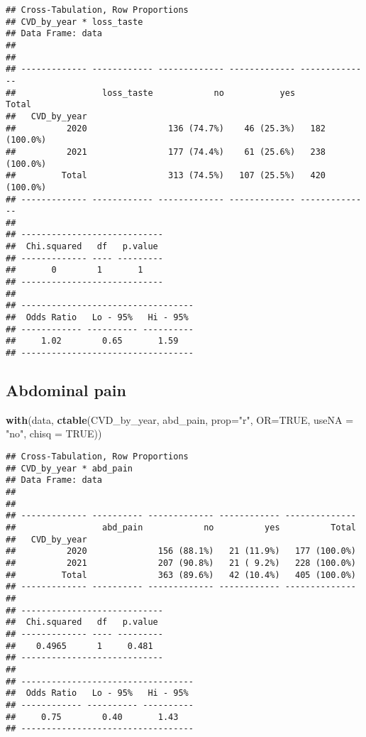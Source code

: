 \documentclass[
]{article}
\newenvironment{Shaded}{\begin{snugshade}}{\end{snugshade}}
\newcommand{\AttributeTok}[1]{\textcolor[rgb]{0.13,0.29,0.53}{#1}}
\newcommand{\ConstantTok}[1]{\textcolor[rgb]{0.56,0.35,0.01}{#1}}
\newcommand{\FunctionTok}[1]{\textcolor[rgb]{0.13,0.29,0.53}{\textbf{#1}}}
\newcommand{\NormalTok}[1]{#1}
\newcommand{\StringTok}[1]{\textcolor[rgb]{0.31,0.60,0.02}{#1}}
\begin{document}
\begin{verbatim}
## Cross-Tabulation, Row Proportions  
## CVD_by_year * loss_taste  
## Data Frame: data  
## 
## 
## ------------- ------------ ------------- ------------- --------------
##                 loss_taste            no           yes          Total
##   CVD_by_year                                                        
##          2020                136 (74.7%)    46 (25.3%)   182 (100.0%)
##          2021                177 (74.4%)    61 (25.6%)   238 (100.0%)
##         Total                313 (74.5%)   107 (25.5%)   420 (100.0%)
## ------------- ------------ ------------- ------------- --------------
## 
## ----------------------------
##  Chi.squared   df   p.value 
## ------------- ---- ---------
##       0        1       1    
## ----------------------------
## 
## ----------------------------------
##  Odds Ratio   Lo - 95%   Hi - 95% 
## ------------ ---------- ----------
##     1.02        0.65       1.59   
## ----------------------------------
\end{verbatim}

\hypertarget{abdominal-pain}{%
\subsection{Abdominal pain}\label{abdominal-pain}}

\begin{Shaded}
\begin{Highlighting}[]
\FunctionTok{with}\NormalTok{(data, }\FunctionTok{ctable}\NormalTok{(CVD\_by\_year, abd\_pain, }\AttributeTok{prop=}\StringTok{"r"}\NormalTok{, }\AttributeTok{OR=}\ConstantTok{TRUE}\NormalTok{, }\AttributeTok{useNA =} \StringTok{"no"}\NormalTok{, }\AttributeTok{chisq =} \ConstantTok{TRUE}\NormalTok{))}
\end{Highlighting}
\end{Shaded}

\begin{verbatim}
## Cross-Tabulation, Row Proportions  
## CVD_by_year * abd_pain  
## Data Frame: data  
## 
## 
## ------------- ---------- ------------- ------------ --------------
##                 abd_pain            no          yes          Total
##   CVD_by_year                                                     
##          2020              156 (88.1%)   21 (11.9%)   177 (100.0%)
##          2021              207 (90.8%)   21 ( 9.2%)   228 (100.0%)
##         Total              363 (89.6%)   42 (10.4%)   405 (100.0%)
## ------------- ---------- ------------- ------------ --------------
## 
## ----------------------------
##  Chi.squared   df   p.value 
## ------------- ---- ---------
##    0.4965      1     0.481  
## ----------------------------
## 
## ----------------------------------
##  Odds Ratio   Lo - 95%   Hi - 95% 
## ------------ ---------- ----------
##     0.75        0.40       1.43   
## ----------------------------------
\end{verbatim}
\end{document}
